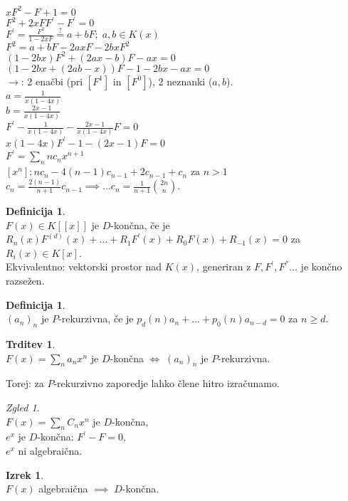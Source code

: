 \documentclass[a4paper, 12pt]{book}
\theoremstyle{definition}
\newtheorem{defn}[counter]{Definicija}
\newtheorem{claim}[counter]{Trditev}
\newtheorem{theorem}[counter]{Izrek}
\theoremstyle{remark}
\newtheorem*{exmp}{Zgled}
\begin{document}
$x F^2 - F + 1 = 0$ \\
$F^2 + 2 x F F^{'} - F^{'} = 0$ \\
$F^{'} = \frac{F^2}{1 - 2 x F} \stackrel{?}{=} a + bF; \; a, b \in K(x)$ \\
$F^2 = a + b F - 2 a x F - 2 b x F^2$ \\
$(1 - 2 b x) F^2 + (2 a x - b) F - a x = 0$ \\
$(1 - 2 b x + (2 a b - x)) F - 1 - 2 b x - a x = 0$ \\
$\to$: 2 enačbi (pri $[F^1]$ in $[F^0]$), 2 neznanki ($a, b$). \\
$a = \frac{1}{x (1-4x)}$ \\
$b = \frac{2x-1}{x (1-4x)}$ \\
$F^{'} - \frac{1}{x (1-4x)} - \frac{2x-1}{x (1-4x)} F = 0$ \\
$x (1-4x) F^{'} - 1 - (2x-1) F = 0$ \\
$F^{'} = \sum_n n c_n x^{n+1}$ \\
$[x^n]: n c_n - 4 (n-1) c_{n-1} + 2 c_{n-1} + c_n$ za $n > 1$ \\
$c_n = \frac{2 (n-1)}{n+1} c_{n-1} \implies \dots c_n = \frac{1}{n+1} \binom{2n}{n}$.
\begin{defn} \text{} \\
  $F(x) \in K[[x]]$ je $D$-končna, če je \\
  $R_n(x) F^{(d)}(x) + \dots + R_1 F^{'}(x) + R_0 F(x) + R_{-1}(x) = 0$ za $R_i(x) \in K[x]$. \\
  Ekvivalentno: vektorski prostor nad $K(x)$, generiran z $F, F^{'}, F^{''} \dots$ je končno razsežen.
\end{defn}
\begin{defn} \text{} \\
  $(a_n)_n$ je $P$-rekurzivna, če je $p_d(n) a_n + \dots + p_0(n) a_{n-d} = 0$ za $n \geq d$.
\end{defn}
\begin{claim} \text{} \\
  $F(x) = \sum_n a_n x^n$ je $D$-končna $\iff \; (a_n)_n$ je $P$-rekurzivna.
\end{claim}
Torej: za $P$-rekurzivno zaporedje lahko člene hitro izračunamo.
\begin{exmp} \text{} \\
  $F(x) = \sum_n C_n x^n$ je $D$-končna, \\
  $e^x$ je $D$-končna: $F^{'} - F = 0$, \\
  $e^x$ ni algebraična.
\end{exmp}
\begin{theorem} \text{} \\
  $F(x)$ algebraična $\implies \; D$-končna.
\end{theorem}
\end{document}
